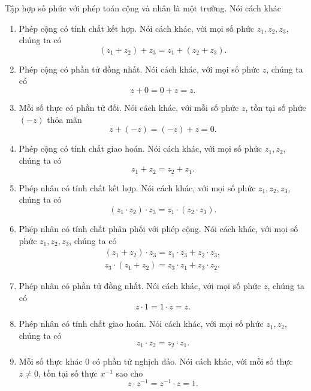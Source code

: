 \begin{theorem}
	Tập hợp số phức với phép toán cộng và nhân là một trường. Nói cách khác
	\begin{enumerate}[label={(F\arabic*)}]
		\item Phép cộng có tính chất kết hợp. Nói cách khác, với mọi số phức $z_{1}, z_{2}, z_{3}$, chúng ta có
		      \[
			      (z_{1} + z_{2}) + z_{3} = z_{1} + (z_{2} + z_{3}).
		      \]
		\item Phép cộng có phần tử đồng nhất. Nói cách khác, với mọi số phức $z$, chúng ta có
		      \[
			      z + 0 = 0 + z = z.
		      \]
		\item Mỗi số thực có phần tử đối. Nói cách khác, với mỗi số phức $z$, tồn tại số phức $(-z)$ thỏa mãn
		      \[
			      z + (-z) = (-z) + z = 0.
		      \]
		\item Phép cộng có tính chất giao hoán. Nói cách khác, với mọi số phức $z_{1}, z_{2}$, chúng ta có
		      \[
			      z_{1} + z_{2} = z_{2} + z_{1}.
		      \]
		\item Phép nhân có tính chất kết hợp. Nói cách khác, với mọi số phức $z_{1}, z_{2}, z_{3}$, chúng ta có
		      \[
			      (z_{1} \cdot z_{2}) \cdot z_{3} = z_{1} \cdot (z_{2} \cdot z_{3}).
		      \]
		\item Phép nhân có tính chất phân phối với phép cộng. Nói cách khác, với mọi số phức $z_{1}, z_{2}, z_{3}$, chúng ta có
		      \[
			      \begin{split}
				      (z_{1} + z_{2})\cdot z_{3} = z_{1}\cdot z_{3} + z_{2}\cdot z_{3}, \\
				      z_{3}\cdot (z_{1} + z_{2}) = z_{3}\cdot z_{1} + z_{3}\cdot z_{2}.
			      \end{split}
		      \]

		\item Phép nhân có phần tử đồng nhất. Nói cách khác, với mọi số phức $z$, chúng ta có
		      \[
			      z \cdot 1 = 1 \cdot z = z.
		      \]
		\item Phép nhân có tính chất giao hoán. Nói cách khác, với mọi số phức $z_{1}, z_{2}$, chúng ta có
		      \[
			      z_{1}\cdot z_{2} = z_{2}\cdot z_{1}.
		      \]
		\item Mỗi số thực khác $0$ có phần tử nghịch đảo. Nói cách khác, với mỗi số thực $z\ne 0$, tồn tại số thực $x^{-1}$ sao cho
		      \[
			      z\cdot z^{-1} = z^{-1}\cdot z = 1.
		      \]
	\end{enumerate}
\end{theorem}

